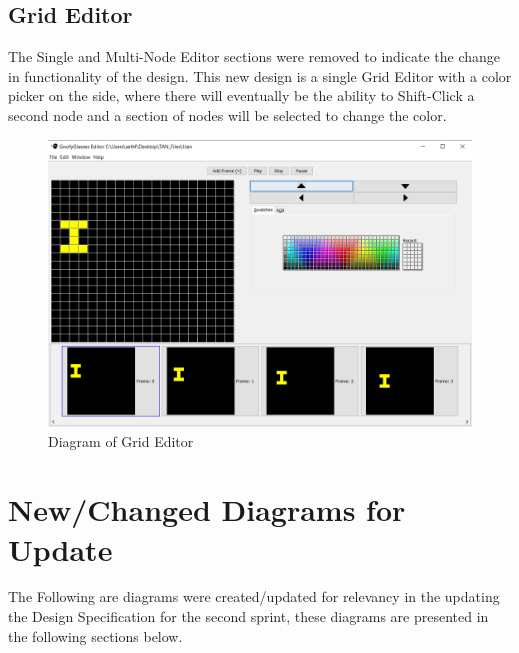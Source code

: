 \documentclass[12pt]{article}
\begin{document}
		\subsection {Grid Editor}
		\forceindent The Single and Multi-Node Editor sections were removed to indicate the change in functionality of the design. This new design is a single Grid Editor with a color picker on the side, where there will eventually be the ability to Shift-Click a second node and a section of nodes will be selected to change the color.
    
    \begin{figure}[ht!]
      \centering
      \includegraphics[width=120mm]{gridEditor.PNG}
      \caption{Diagram of Grid Editor}
    \end{figure}
		\newpage
		
		\section{New/Changed Diagrams for Update}
		\forceindent The Following are diagrams were created/updated for relevancy in the updating the Design Specification for the second sprint, these diagrams are presented in the following sections below.
	
\end{document}
